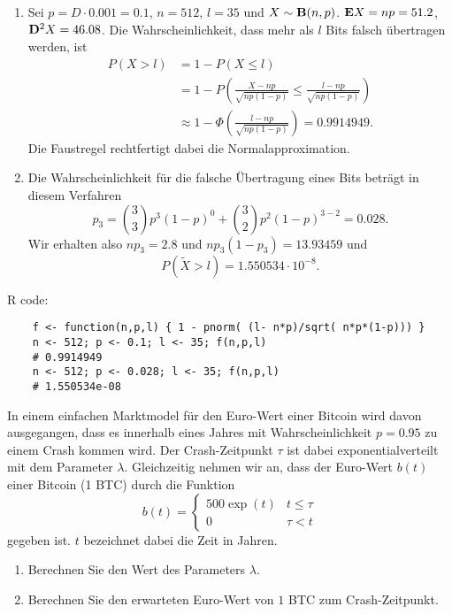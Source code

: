 \solution
\begin{enumerate}
    \item Sei $p = D\cdot{} 0.001 = 0.1$, $n=512$, $l=35$ und $X \sim \mathbf B(n,
        p)$. $\mathbf E X = np= 51.2$, $\mathbf D^2 X = 46.08$. Die Wahrscheinlichkeit,
        dass mehr als $l$ Bits falsch übertragen werden, ist 
        \begin{align*}
            P\left( X > l \right) &= 1 - P\left( X \leq l \right) \\
            &= 1- P\left( \frac{X - np}{\sqrt{np(1-p)}} \leq \frac{l -np}{ \sqrt{np(1-p)}} \right) \\
            &\approx 1 - \Phi\left( \frac{l -np}{ \sqrt{np(1-p)}}  \right) =  0.9914949.
        \end{align*}
        Die Faustregel rechtfertigt dabei die Normalapproximation. 
    \item Die Wahrscheinlichkeit für die falsche Übertragung eines Bits beträgt
        in diesem Verfahren
        \begin{equation*}
            p_3 = \binom{3}{3} p^{3}\left( 1-p \right)^{0} + \binom{3}{2} p^{2} \left( 1-p \right)^{3-2} = 
            0.028.
        \end{equation*}
        Wir erhalten also $n p_3 = 2.8$ und $n p_3 (1-p_3) = 13.93459$ und
        \begin{equation*}
            P\left( \tilde X > l \right) =  1.550534 \cdot{} 10^{-8}. 
        \end{equation*}
\end{enumerate} 
R code:
\begin{lstlisting}
    f <- function(n,p,l) { 1 - pnorm( (l- n*p)/sqrt( n*p*(1-p))) }
    n <- 512; p <- 0.1; l <- 35; f(n,p,l)
    # 0.9914949
    n <- 512; p <- 0.028; l <- 35; f(n,p,l)
    # 1.550534e-08
\end{lstlisting}


 In einem einfachen Marktmodel für
den Euro-Wert einer Bitcoin wird davon ausgegangen, dass es innerhalb eines
Jahres mit Wahrscheinlichkeit $p=0.95$ zu einem Crash kommen wird. Der
Crash-Zeitpunkt $\tau$ ist dabei exponentialverteilt mit dem Parameter
$\lambda$. Gleichzeitig nehmen wir an, dass der Euro-Wert $b(t)$ einer Bitcoin
(1 BTC) durch die Funktion
\begin{equation*}
    b(t) =
    \begin{cases}
        500 \exp( t ) & t \leq \tau \\
        0 & \tau < t
    \end{cases}
\end{equation*}
gegeben ist. $t$ bezeichnet dabei die Zeit in Jahren. 
\begin{enumerate}
    \item Berechnen Sie den Wert des Parameters $\lambda$.
    \item Berechnen Sie den erwarteten Euro-Wert von $1$ BTC zum Crash-Zeitpunkt.
\end{enumerate}

